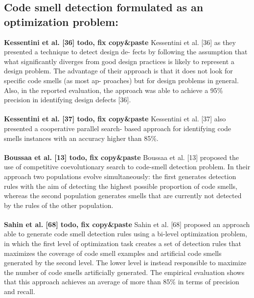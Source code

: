 \subsection{Code smell detection formulated as an optimization problem:}
\textbf{Kessentini et al. [36] todo, fix copy\&paste }
Kessentini et al. [36] as they presented a technique to detect design de- fects by following the assumption that what significantly diverges from good design practices is likely to represent a design problem. The advantage of their approach is that it does not look for specific code smells (as most ap- proaches) but for design problems in general. Also, in the reported evaluation, the approach was able to achieve a 95\% precision in identifying design defects [36].
\\
\\
\textbf{Kessentini et al. [37] todo, fix copy\&paste }
Kessentini et al. [37] also presented a cooperative parallel search- based approach for identifying code smells instances with an accuracy higher than 85\%.
\\
\\
\textbf{Boussaa et al. [13] todo, fix copy\&paste }
Boussaa et al. [13] proposed the use of competitive coevolutionary search to code-smell detection problem. In their approach two populations evolve simultaneously: the first generates detection rules with the aim of detecting the highest possible proportion of code smells, whereas the second population generates smells that are currently not detected by the rules of the other population.
\\
\\
\textbf{Sahin et al. [68] todo, fix copy\&paste }
Sahin et al. [68] proposed an approach able to generate code smell detection rules using a bi-level optimization problem, in which the first level of optimization task creates a set of detection rules that maximizes the coverage of code smell examples and artificial code smells generated by the second level. The lower level is instead responsible to maximize the number of code smells artificially generated. The empirical evaluation shows that this approach achieves an average of more than 85\% in terms of precision and recall.
\\
\\
